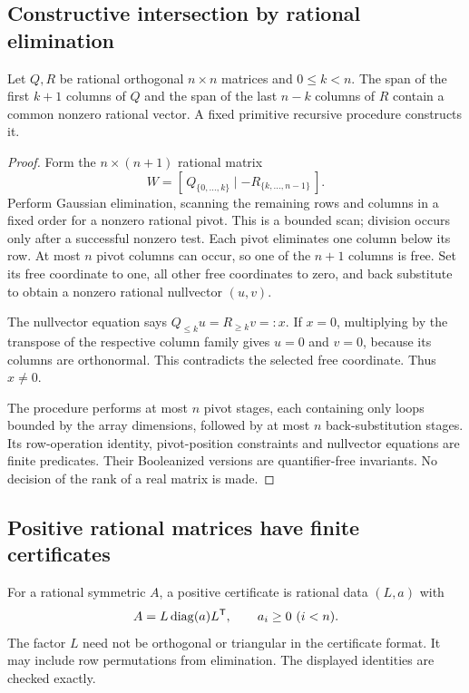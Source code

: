\subsection{Constructive intersection by rational elimination}

\begin{lemma}
\label{lem:intersection}
Let $Q,R$ be rational orthogonal $n\times n$ matrices and $0\le k<n$. The span of the first $k+1$ columns of $Q$ and the span of the last $n-k$ columns of $R$ contain a common nonzero rational vector. A fixed primitive recursive procedure constructs it.
\end{lemma}
\begin{proof}
Form the $n\times(n+1)$ rational matrix
\[
 W=[\,Q_{\{0,\ldots,k\}}\mid -R_{\{k,\ldots,n-1\}}\,].
\]
Perform Gaussian elimination, scanning the remaining rows and columns in a fixed order for a nonzero rational pivot. This is a bounded scan; division occurs only after a successful nonzero test. Each pivot eliminates one column below its row. At most $n$ pivot columns can occur, so one of the $n+1$ columns is free. Set its free coordinate to one, all other free coordinates to zero, and back substitute to obtain a nonzero rational nullvector $(u,v)$.

The nullvector equation says $Q_{\le k}u=R_{\ge k}v=:x$. If $x=0$, multiplying by the transpose of the respective column family gives $u=0$ and $v=0$, because its columns are orthonormal. This contradicts the selected free coordinate. Thus $x\ne0$.

The procedure performs at most $n$ pivot stages, each containing only loops bounded by the array dimensions, followed by at most $n$ back-substitution stages. Its row-operation identity, pivot-position constraints and nullvector equations are finite predicates. Their Booleanized versions are quantifier-free invariants. No decision of the rank of a real matrix is made.
\end{proof}

\subsection{Positive rational matrices have finite certificates}

\begin{definition}
For a rational symmetric $A$, a positive certificate is rational data $(L,a)$ with
\[
 A=L\operatorname{diag}(a)L^{\mathsf T},\qquad a_i\ge0\ (i<n).
\]
The factor $L$ need not be orthogonal or triangular in the certificate format. It may include row permutations from elimination. The displayed identities are checked exactly.
\end{definition}

